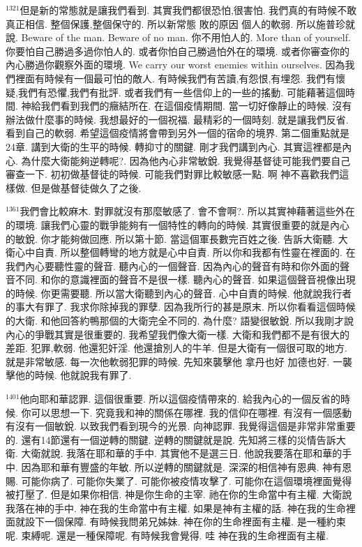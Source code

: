 \documentclass{book}
\begin{document}
$^{1321}$但是新的常態就是讓我們看到.
其實我們都很恐怕,很害怕.
我們真的有時候不敢真正相信.
整個保護,整個保守的.
所以新常態 敗的原因 個人的軟弱.
所以施普珍就說.
Beware of the man.
Beware of no man.
你不用怕人的.
More than of yourself.
你要怕自己勝過多過你怕人的.
或者你怕自己勝過怕外在的環境.
或者你審查你的內心勝過你觀察外面的環境.
We carry our worst enemies within ourselves.
因為我們裡面有時候有一個最可怕的敵人.
有時候我們有苦讀,有怨恨,有埋怨.
我們有懷疑,我們有恐懼,我們有批評.
或者我們有一些信仰上的一些的搖動.
可能藉著這個時間.
神給我們看到我們的癥結所在.
在這個疫情期間.
當一切好像靜止的時候.
沒有辦法做什麼事的時候.
我想最好的一個祝福.
最精彩的一個時刻.
就是讓我們反省.
看到自己的軟弱.
希望這個疫情將會帶到另外一個的宿命的境界.
第二個重點就是24章.
講到大衛的生平的時候.
轉抑寸的關鍵.
剛才我們講到內心.
其實這裡都是內心.
為什麼大衛能夠逆轉呢?.
因為他內心非常敏銳.
我覺得基督徒可能我們要自己審查一下.
初初做基督徒的時候.
可能我們對罪比較敏感一點.
啊 神不喜歡我們這樣做.
但是做基督徒做久了之後.

$^{1361}$我們會比較麻木.
對罪就沒有那麼敏感了.
會不會啊?.
所以其實神藉著這些外在的環境.
讓我們心靈的戰爭能夠有一個特性的轉向的時候.
其實很重要的就是內心的敏銳.
你才能夠做回應.
所以第十節.
當這個軍長數完百姓之後.
告訴大衛聽.
大衛心中自責.
所以整個轉彎的地方就是心中自責.
所以你和我都有性靈在裡面的.
在我們內心要聽性靈的聲音.
聽內心的一個聲音.
因為內心的聲音有時和你外面的聲音不同.
和你的意識裡面的聲音不是很一樣.
聽內心的聲音.
如果這個聲音視像出現的時候.
你更需要聽.
所以當大衛聽到內心的聲音.
心中自責的時候.
他就說我行者的事大有罪了.
我求你除掉我的罪孽.
因為我所行的甚是原末.
所以你看看這個時候的大衛.
和他回答約鴨那個的大衛完全不同的.
為什麼? 語變很敏銳.
所以我剛才說內心的爭戰其實是很重要的.
我希望我們像大衛一樣.
大衛和我們都不是有很大的差距.
犯罪,軟弱.
他還犯奸淫.
他還搶別人的牛羊.
但是大衛有一個很可取的地方.
就是非常敏感.
每一次他軟弱犯罪的時候.
先知來襲擊他 拿丹也好 加德也好.
一襲擊他的時候.
他就說我有罪了.

$^{1401}$他向耶和華認罪.
這個很重要.
所以這個疫情帶來的.
給我內心的一個反省的時候.
你可以思想一下.
究竟我和神的關係在哪裡.
我的信仰在哪裡.
有沒有一個感動 有沒有一個敏銳.
以致我們看到現今的光景.
向神認罪.
我覺得這個是非常非常重要的.
還有14節還有一個逆轉的關鍵.
逆轉的關鍵就是說.
先知將三樣的災情告訴大衛.
大衛就說.
我落在耶和華的手中.
其實他不是選三日.
他說我要落在耶和華的手中.
因為耶和華有豐盛的年敏.
所以逆轉的關鍵就是.
深深的相信神有恩典.
神有恩賜.
可能你病了.
可能你失業了.
可能你被疫情攻擊了.
可能你在這個環境裡面覺得被打壓了.
但是如果你相信.
神是你生命的主宰.
祂在你的生命當中有主權.
大衛說我落在神的手中.
神在我的生命當中有主權.
如果是神有主權的話.
神在我的生命裡面就設下一個保障.
有時候我問弟兄姊妹.
神在你的生命裡面有主權.
是一種約束呢.
束縛呢.
還是一種保障呢.
有時候我會覺得.
哇 神在我的生命裡面有主權.
\end{document}
